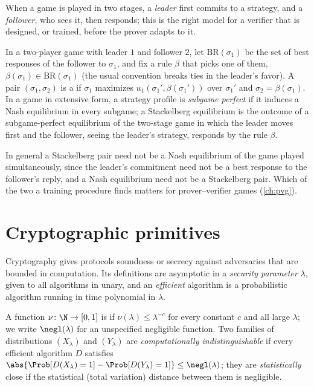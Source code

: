 \begin{refsection}
When a game is played in two stages, a \emph{leader} first commits to a strategy, and a \emph{follower}, who sees it, then responds; this is the right model for a verifier that is designed, or trained, before the prover adapts to it.

\begin{definition}\label{def:toolkit:stackelberg}
In a two-player game with leader $1$ and follower $2$, let $\mathrm{BR}(\sigma_1)$ be the set of best responses of the follower to $\sigma_1$, and fix a rule $\beta$ that picks one of them, $\beta(\sigma_1)\in\mathrm{BR}(\sigma_1)$ (the usual convention breaks ties in the leader's favor). A pair $(\sigma_1,\sigma_2)$ is a  if $\sigma_1$ maximizes $u_1(\sigma_1',\beta(\sigma_1'))$ over $\sigma_1'$ and $\sigma_2=\beta(\sigma_1)$. In a game in extensive form, a strategy profile is \emph{subgame perfect} if it induces a Nash equilibrium in every subgame; a Stackelberg equilibrium is the outcome of a subgame-perfect equilibrium of the two-stage game in which the leader moves first and the follower, seeing the leader's strategy, responds by the rule $\beta$.
\end{definition}

In general a Stackelberg pair need not be a Nash equilibrium of the game played simultaneously, since the leader's commitment need not be a best response to the follower's reply, and a Nash equilibrium need not be a Stackelberg pair. Which of the two a training procedure finds matters for prover--verifier games (\cref{ch:pvg}).

\section{Cryptographic primitives}\label{sec:toolkit:crypto}

Cryptography gives protocols soundness or secrecy against adversaries that are bounded in computation. Its definitions are asymptotic in a \emph{security parameter} $\lambda$, given to all algorithms in unary, and an \emph{efficient} algorithm is a probabilistic algorithm running in time polynomial in $\lambda$.

\begin{definition}\label{def:toolkit:negl}
A function $\nu\colon\N\to[0,1]$ is  if $\nu(\lambda)\le\lambda^{-c}$ for every constant $c$ and all large $\lambda$; we write $\negl(\lambda)$ for an unspecified negligible function. Two families of distributions $(X_\lambda)$ and $(Y_\lambda)$ are \emph{computationally indistinguishable} if every efficient algorithm $D$ satisfies $\abs{\Prob[D(X_\lambda)=1]-\Prob[D(Y_\lambda)=1]}\le\negl(\lambda)$; they are \emph{statistically} close if the statistical (total variation) distance between them is negligible.
\end{definition}


\end{refsection}
